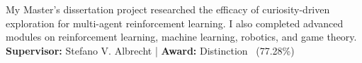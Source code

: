 \documentclass[a4paper,12pt]{article}
\begin{document}
\begin{expblock}
    My Master's dissertation project researched the efficacy of curiosity-driven exploration for multi-agent reinforcement learning. I also completed advanced modules on reinforcement learning, machine learning, robotics, and game theory.\\
    \textbf{Supervisor:} Stefano V. Albrecht \hspace{1em} | \hspace{1em} 
    \textbf{Award:} Distinction \ (77.28\%)
\end{expblock}
\end{document}
